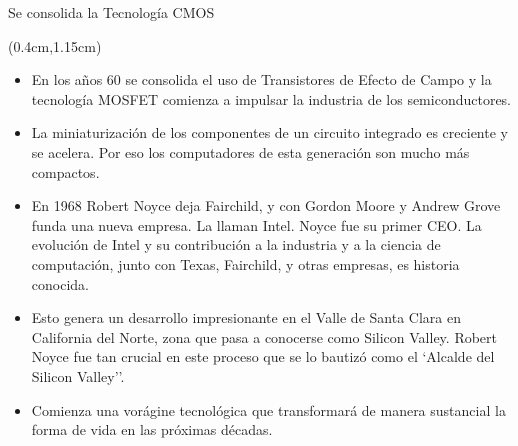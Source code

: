 \documentclass[table,dvipsnames,aspectratio=169]{beamer}
\begin{document}
\begin{frame}{Se consolida la Tecnología CMOS}
 \begin{textblock*}{\textwidth}(0.4cm,1.15cm)
  \begin{itemize}[<+(1)->] \justifying %
   \item \textcolor{furfiBlue}{En los años 60 se consolida el uso de Transistores de Efecto de Campo y la tecnología MOSFET comienza a impulsar la industria de los semiconductores.}
   \item {\small La miniaturización de los componentes de un circuito integrado es creciente y se acelera. Por eso los computadores de esta generación son mucho más compactos.}
   \item {\small \textcolor{furfiBlue}{En 1968 Robert Noyce deja Fairchild, y con Gordon Moore y Andrew Grove funda una nueva empresa. La llaman Intel.} Noyce fue su primer CEO.
   La evolución de Intel y su contribución a la industria y a la ciencia de computación, junto con Texas, Fairchild, y otras empresas, es historia conocida.}
   \item {\small Esto genera un desarrollo impresionante en el Valle de Santa Clara en California del Norte, zona que pasa a conocerse como Silicon Valley.
   Robert Noyce fue tan crucial en este proceso que se lo bautizó como el `Alcalde del Silicon Valley''.}
   \item \textcolor{furfiGreen}{Comienza una vorágine tecnológica que transformará de manera sustancial la forma de vida en las próximas décadas.}
  \end{itemize}
 \end{textblock*}
\end{frame}
\end{document}
